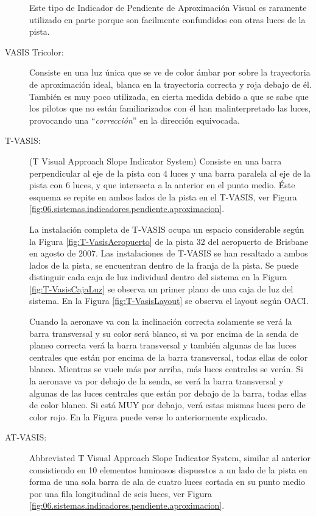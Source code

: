 \begin{description}
Este tipo de
Indicador de Pendiente de Aproximación Visual es raramente utilizado en parte porque son
facilmente confundidos con otras luces de la pista.

\item[VASIS Tricolor:] Consiste en una luz única que se ve de color ámbar por sobre la trayectoria
de aproximación ideal, blanca en la trayectoria correcta y roja debajo de él. También es muy
poco utilizada, en cierta medida debido a que se sabe que los pilotos que no están familiarizados
con él han malinterpretado las luces, provocando una ``\emph{corrección}'' en la dirección equivocada.

\item[T-VASIS:] (T Visual Approach Slope Indicator System) 
  Consiste en una barra perpendicular al eje de la pista
con 4 luces y una barra paralela al eje de la pista con 6 luces, y que intersecta a la anterior en
el punto medio. Éste esquema se repite en ambos lados de la pista en el T-VASIS,
ver Figura \ref{fig:06.sistemas.indicadores.pendiente.aproximacion}.

La instalación completa de T-VASIS ocupa un espacio considerable según la Figura \ref{fig:T-VasisAeropuerto} 
de la pista 32 del aeropuerto de Brisbane en agosto de 2007.
Las instalaciones de T-VASIS se han resaltado a ambos lados de la pista, se encuentran dentro de la franja de la pista.
Se puede distinguir cada caja de luz individual dentro del sistema
en la Figura \ref{fig:T-VasisCajaLuz} 
se observa un primer plano de una caja de luz del sistema. En la Figura \ref{fig:T-VasisLayout}
se observa el layout según OACI.

Cuando la aeronave va con la inclinación correcta solamente se
verá la barra transversal y su color será blanco, si va por encima de la senda de planeo correcta
verá la barra transversal y también algunas de las luces centrales que están por encima de la
barra transversal, todas ellas de color blanco. Mientras se vuele más por arriba, más luces
centrales se verán.
Si la aeronave va por debajo de la senda, se verá la barra transversal y algunas de las luces
centrales que están por debajo de la barra, todas ellas de color blanco. Si está MUY por debajo,
verá estas mismas luces pero de color rojo. En la Figura 
puede verse lo anteriormente explicado.

\item[AT-VASIS:] Abbreviated T Visual Approach Slope Indicator System, similar al anterior 
consistiendo en 10 elementos luminosos dispuestos a un lado de la pista en forma de una sola barra
de ala de cuatro luces cortada en su punto medio por una fila longitudinal de seis luces,
ver Figura \ref{fig:06.sistemas.indicadores.pendiente.aproximacion}.

\end{description}

